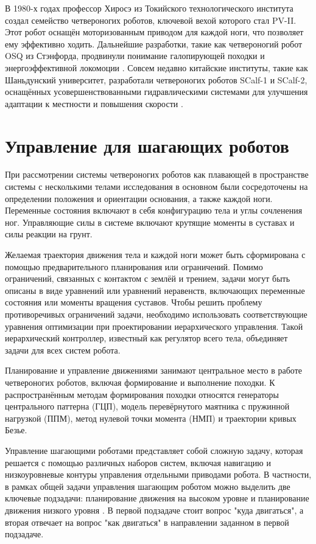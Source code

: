 В 1980-х годах профессор Хиросэ из Токийского технологического института создал семейство четвероногих роботов, ключевой вехой которого стал PV-II. Этот робот оснащён моторизованным приводом для каждой ноги, что позволяет ему эффективно ходить\cite{Hirose2009}. Дальнейшие разработки, такие как четвероногий робот OSQ из Стэнфорда, продвинули понимание галопирующей походки и энергоэффективной локомоции \cite{Nichol2004}.  Совсем недавно китайские институты, такие как Шаньдунский университет, разработали четвероногих роботов SCalf-1 и SCalf-2, оснащённых усовершенствованными гидравлическими системами для улучшения адаптации к местности и повышения скорости \cite{Rong2012}.

\section{Управление для шагающих роботов}\label{sec:ch1/sec2}

При рассмотрении системы четвероногих роботов как плавающей в пространстве системы с несколькими телами исследования в основном были сосредоточены на определении положения и ориентации основания, а также каждой ноги. Переменные состояния включают в себя конфигурацию тела и углы сочленения ног. Управляющие силы в системе включают крутящие моменты в суставах и силы реакции на грунт.

Желаемая траектория движения тела и каждой ноги может быть сформирована с помощью предварительного планирования или ограничений. Помимо ограничений, связанных с контактом с землёй и трением,\cite{henze2017multi} задачи могут быть описаны в виде уравнений или уравнений неравенств, включающих переменные состояния или моменты вращения суставов. Чтобы решить проблему противоречивых ограничений задачи, необходимо использовать соответствующие уравнения оптимизации при проектировании иерархического управления. Такой иерархический контроллер, известный как регулятор всего тела,\cite{fahmi2019passive} объединяет задачи для всех систем робота. 

Планирование и управление движениями занимают центральное место в работе четвероногих роботов, включая формирование и выполнение походки.  К распространённым методам формирования походки относятся генераторы центрального паттерна (ГЦП), модель перевёрнутого маятника с пружинной нагрузкой (ППМ), метод нулевой точки момента (НМП) и траектории кривых Безье.

Управление шагающими роботами представляет собой сложную задачу, которая решается с помощью различных наборов систем, включая навигацию и низкоуровневые контуры управления отдельными приводами робота. В частности, в рамках общей задачи управления шагающим роботом можно выделить две ключевые подзадачи: планирование движения на высоком уровне и планирование движения низкого уровня \cite{WalkingRobots}. В первой подзадаче стоит вопрос "куда двигаться", а вторая отвечает на вопрос "как двигаться" в направлении заданном в первой подзадаче.

